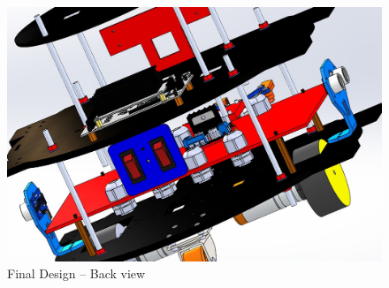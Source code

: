 \begin{figure}[h!]
	\centering
	\includegraphics[scale=0.32]{./Figures/Mech/bacc.jpeg}
	\caption{Final Design -- Back view}
	\label{fig:mech4}
\end{figure}
\newpage

% 
